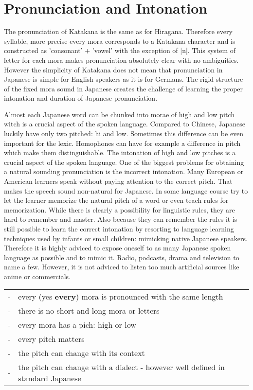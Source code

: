 \documentclass[paper=a4,headings=small,titlepage,makeidx,fontsize=12pt]{scrbook}
\begin{document}
\section{Pronunciation and Intonation}

The pronunciation of Katakana is the same as for Hiragana. Therefore every
syllable, more precise every mora corresponds to a Katakana character and is
constructed as 'consonant' + 'vowel' with the exception of |n|. This system of
letter for each mora makes pronunciation absolutely clear with no
ambiguities. However the simplicity of Katakana does not mean that
pronunciation in Japanese is simple for English speakers as it is for Germans. 
The rigid structure of the fixed mora sound in Japanese creates the challenge 
of learning the proper intonation and duration of Japanese pronunciation. 

Almost each Japanese word can be chunked into morae of high and low pitch witch
is a crucial aspect of the spoken language. Compared to Chinese, Japanese
luckily have only two pitched: hi and low. Sometimes this difference can be
even important for the lexic. Homophones can have for example a difference in
pitch which make them distinguishable.  The intonation of high and low pitches
is a crucial aspect of the spoken language. One of the biggest problems for
obtaining a natural sounding pronunciation is the incorrect intonation. Many
European or American learners speak without paying attention to the correct
pitch. That makes the speech sound non-natural for Japanese. In some language
course try to let the learner memorize the natural pitch of a word or even
teach rules for memorization. While there is clearly a possibility for
linguistic rules, they are hard to remember and master. Also because they can
remember the rules it is still possible to learn the correct intonation by
resorting to language learning techniques used by infants or small children:
mimicking native Japanese speakers. Therefore it is highly adviced to expose
oneself to as many Japanese spoken language as possible and to mimic it. Radio,
podcasts, drama and television to name a few. However, it is not adviced to
listen too much artificial sources like anime or commercials.  

\begin{tabular}{rl}
-&every (yes \textbf{every}) mora is pronounced with the same length\\
-&there is no short and long mora or letters\\
-&every mora has a pich: high or low\\
-&every pitch matters\\
-&the pitch can change with its context\\
-&the pitch can change with a dialect - however well defined in standard Japanese\\
\end{tabular}
\end{document}
